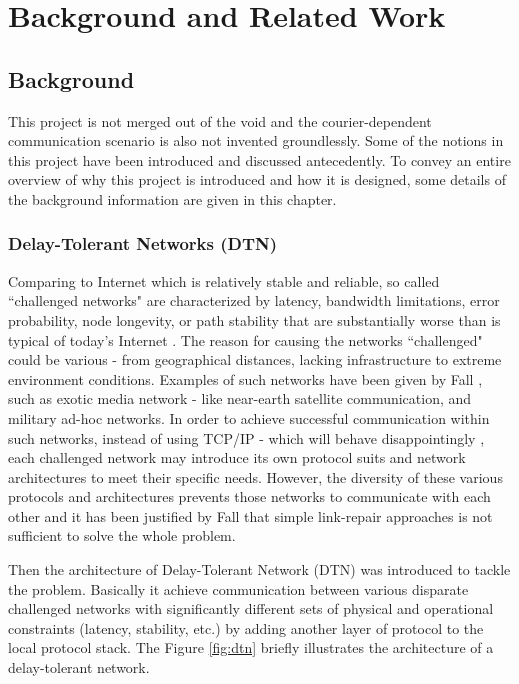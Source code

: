 \chapter{Background and Related Work}
\section{Background}
This project is not merged out of the void and the courier-dependent communication scenario is also not invented groundlessly. Some of the notions in this project have been introduced and discussed antecedently. To convey an entire overview of why this project is introduced and how it is designed, some details of the background information are given in this chapter.
\subsection{Delay-Tolerant Networks (DTN)}
Comparing to Internet which is relatively stable and reliable, so called ``challenged networks" are characterized by latency, bandwidth limitations, error probability, node longevity, or path stability that are substantially worse than is typical of today’s Internet \cite{Fall}. The reason for causing the networks ``challenged" could be various - from geographical distances, lacking infrastructure to extreme environment conditions. Examples of such networks have been given by Fall \cite{Fall}, such as exotic media network - like near-earth satellite communication, and military ad-hoc networks. In order to achieve successful communication within such networks, instead of using TCP/IP - which will behave disappointingly \cite{Burleigh}, each challenged network may introduce its own protocol suits and network architectures to meet their specific needs. However, the diversity of these various protocols and architectures prevents those networks to communicate with each other and it has been justified by Fall that simple link-repair approaches is not sufficient to solve the whole problem.

Then the architecture of Delay-Tolerant Network (DTN) was introduced to tackle the problem. Basically it achieve communication between various disparate challenged networks with significantly different sets of physical and operational constraints (latency, stability, etc.) by adding another layer of protocol to the local protocol stack. The Figure \ref{fig:dtn} briefly illustrates the architecture of a delay-tolerant network.

